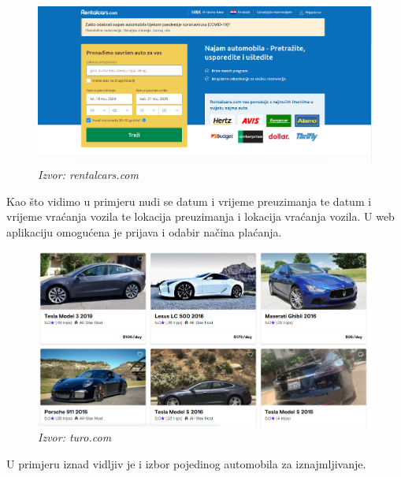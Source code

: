 		 \begin{figure}[hp]
                \centering
                \includegraphics[width=15cm]{slike/stranica1.png}
                \caption{\textit{Izvor: rentalcars.com}}
            \end{figure}

		 \text Kao što vidimo u primjeru nudi se datum i vrijeme preuzimanja te datum i vrijeme vraćanja vozila te lokacija preuzimanja i lokacija vraćanja vozila. U web aplikaciju omogućena je prijava i odabir načina plaćanja. \par 
		\pagebreak
		 
		 \begin{figure}[h]
                \centering
                \includegraphics[width=15cm]{slike/stranica2.png}
                \caption{\textit{Izvor: turo.com}}
            \end{figure}
            
		 \text U primjeru iznad vidljiv je i izbor pojedinog automobila za iznajmljivanje. \par


